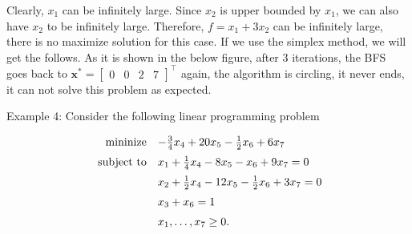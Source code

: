 Clearly, \(x_{1}\) can be infinitely large. Since \(x_{2}\) is upper bounded by \(x_{1}\), we can also have \(x_{2}\) to be infinitely large. Therefore, \(f=x_{1}+3 x_{2}\) can be infinitely large, there is no maximize solution for this case. If we use the simplex method, we will get the follows. As it is shown in the below figure, after 3 iterations, the BFS goes back to \(\boldsymbol{x}^{*}=\left[\begin{array}{llll}0 & 0 & 2 & 7\end{array}\right]^{\top}\) again, the algorithm is circling, it never ends, it can not solve this problem as expected.

\begin{center}
\end{center}


\medskip
\noindent
Example 4: Consider the following linear programming problem

\[
	\begin{array}{rl}
		\operatorname{mininize} & -\frac{3}{4} x_{4}+20 x_{5}-\frac{1}{2} x_{6}+6 x_{7} \vspace{2mm}\\
		\text { subject to} & x_{1}+\frac{1}{4} x_{4}-8 x_{5}-x_{6}+9 x_{7}=0 \vspace{2mm}\\
		& x_{2}+\frac{1}{2} x_{4}-12 x_{5}-\frac{1}{2} x_{6}+3 x_{7}=0 \vspace{2mm}\\
		& x_{3}+x_{6}=1 \vspace{2mm}\\
		& x_{1}, \ldots, x_{7} \geq 0 .
	\end{array}
\]


